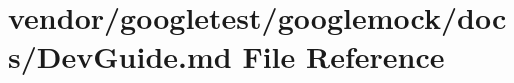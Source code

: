 \hypertarget{googlemock_2docs_2_dev_guide_8md}{}\section{vendor/googletest/googlemock/docs/\+Dev\+Guide.md File Reference}
\label{googlemock_2docs_2_dev_guide_8md}
